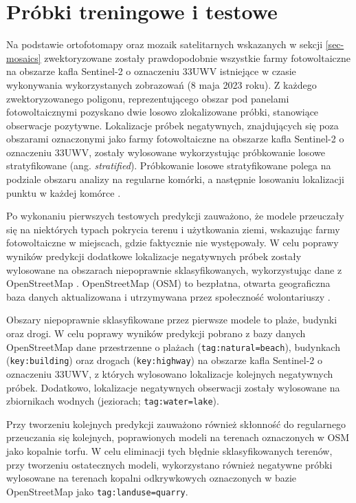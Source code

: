\documentclass{amuthesis}
\begin{document}
\hypertarget{sec-samples-methods}{%
\section{Próbki treningowe i testowe}\label{sec-samples-methods}}

Na podstawie ortofotomapy oraz mozaik satelitarnych wskazanych w sekcji
\ref{sec-mosaics} zwektoryzowane zostały prawdopodobnie wszystkie farmy
fotowoltaiczne na obszarze kafla Sentinel-2 o oznaczeniu 33UWV
istniejące w czasie wykonywania wykorzystanych zobrazowań (8 maja 2023
roku). Z każdego zwektoryzowanego poligonu, reprezentującego obszar pod
panelami fotowoltaicznymi pozyskano dwie losowo zlokalizowane próbki,
stanowiące obserwacje pozytywne. Lokalizacje próbek negatywnych,
znajdujących się poza obszarami oznaczonymi jako farmy fotowoltaiczne na
obszarze kafla Sentinel-2 o oznaczeniu 33UWV, zostały wylosowane
wykorzystując próbkowanie losowe stratyfikowane (ang.
\emph{stratified}). Próbkowanie losowe stratyfikowane polega na podziale
obszaru analizy na regularne komórki, a następnie losowaniu lokalizacji
punktu w każdej komórce \autocite{nowosad_2021_geostatystyka_r}.

Po wykonaniu pierwszych testowych predykcji zauważono, że modele
przeuczały się na niektórych typach pokrycia terenu i użytkowania ziemi,
wskazując farmy fotowoltaiczne w miejscach, gdzie faktycznie nie
występowały. W celu poprawy wyników predykcji dodatkowe lokalizacje
negatywnych próbek zostały wylosowane na obszarach niepoprawnie
sklasyfikowanych, wykorzystując dane z OpenStreetMap
\autocite{OpenStreetMap}. OpenStreetMap (OSM) to bezpłatna, otwarta
geograficzna baza danych aktualizowana i utrzymywana przez społeczność
wolontariuszy \autocite{bennett_2010_openstreetmap}.

Obszary niepoprawnie sklasyfikowane przez pierwsze modele to plaże,
budynki oraz drogi. W celu poprawy wyników predykcji pobrano z bazy
danych OpenStreetMap dane przestrzenne o plażach
(\texttt{tag:natural=beach}), budynkach (\texttt{key:building}) oraz
drogach (\texttt{key:highway}) na obszarze kafla Sentinel-2 o oznaczeniu
33UWV, z których wylosowano lokalizacje kolejnych negatywnych próbek.
Dodatkowo, lokalizacje negatywnych obserwacji zostały wylosowane na
zbiornikach wodnych (jeziorach; \texttt{tag:water=lake}).

Przy tworzeniu kolejnych predykcji zauważono również skłonność do
regularnego przeuczania się kolejnych, poprawionych modeli na terenach
oznaczonych w OSM jako kopalnie torfu. W celu eliminacji tych błędnie
sklasyfikowanych terenów, przy tworzeniu ostatecznych modeli,
wykorzystano również negatywne próbki wylosowane na terenach kopalni
odkrywkowych oznaczonych w bazie OpenStreetMap jako
\texttt{tag:landuse=quarry}.
\end{document}
